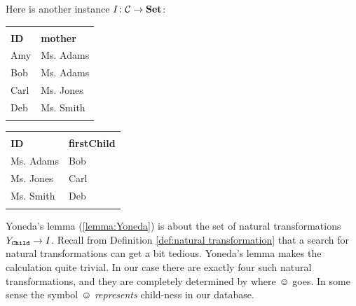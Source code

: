 \documentclass[CT4S-EN-RU]{subfiles}
\begin{document}
\begin{exampleENG}
Here is another instance $I\taking\mcC\to\Set$:
\begin{center}
\begin{tabular}{| l || l |}\bhline
\multicolumn{2}{|c|}{\tt Child}\\\bhline
{\bf ID}&{\bf mother}\\\hline
Amy&Ms. Adams\\\hline
Bob&Ms. Adams\\\hline
Carl&Ms. Jones\\\hline
Deb&Ms. Smith\\\bhline
\end{tabular}
\hsp
\begin{tabular}{| l || l |}\bhline
\multicolumn{2}{|c|}{\tt Mother}\\\bhline
{\bf ID}&{\bf firstChild}\\\bbhline
Ms. Adams&Bob\\\hline
Ms. Jones&Carl\\\hline
Ms. Smith&Deb\\\bhline
\end{tabular}
\end{center}
\end{exampleENG}

\begin{exampleRUS}\label{ex:yoneda}
\end{exampleRUS}

\begin{blockENG}
Yoneda's lemma (\ref{lemma:Yoneda}) is about the set of natural transformations $Y_{\tt Child}\to I$. Recall from Definition \ref{def:natural transformation} that a search for natural transformations can get a bit tedious. Yoneda's lemma makes the calculation quite trivial. In our case there are exactly four such natural transformations, and they are completely determined by where $\smiley$ goes. In some sense the symbol $\smiley$ {\em represents} child-ness in our database. 
\end{blockENG}

\begin{blockRUS}
\end{blockRUS}
\end{document}
